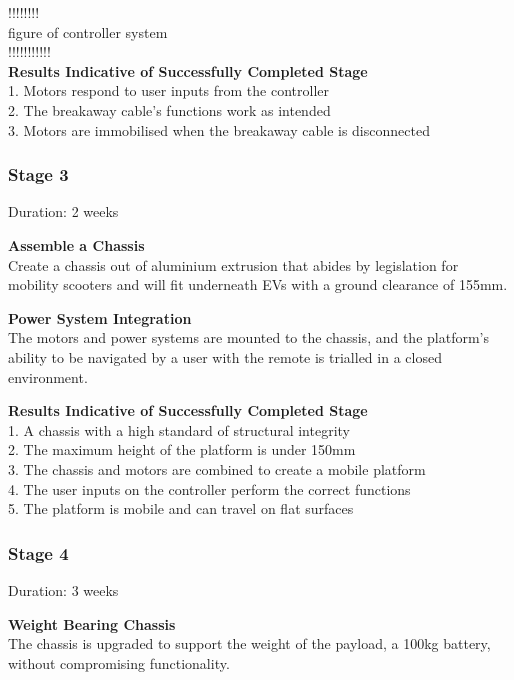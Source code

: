 \documentclass [12pt]{article}
\begin{document}
!!!!!!!!\\
figure of controller system \\
!!!!!!!!!!! \\

\textbf{Results Indicative of Successfully Completed Stage}\\
1.	Motors respond to user inputs from the controller\\
2.	The breakaway cable's functions work as intended\\
3.	Motors are immobilised when the breakaway cable is disconnected\\


\subsubsection{Stage 3}

Duration: 2 weeks

\textbf{Assemble a Chassis}\\
Create a chassis out of aluminium extrusion that abides by legislation for mobility scooters and will fit underneath EVs with a ground clearance of 155mm.

\textbf{Power System Integration}\\
The motors and power systems are mounted to the chassis, and the platform’s ability to be navigated by a user with the remote is trialled in a closed environment.

\textbf{Results Indicative of Successfully Completed Stage}\\
1.	A chassis with a high standard of structural integrity \\
2.	The maximum height of the platform is under 150mm\\
3.	The chassis and motors are combined to create a mobile platform\\
4.	The user inputs on the controller perform the correct functions\\
5.	The platform is mobile and can travel on flat surfaces\\


\subsubsection{Stage 4}
Duration: 3 weeks

\textbf{Weight Bearing Chassis}\\
The chassis is upgraded to support the weight of the payload, a 100kg battery, without compromising functionality.
\end{document}
